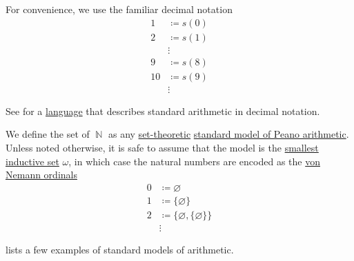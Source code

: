 \begin{definition}
  For convenience, we use the familiar decimal notation
  \begin{align*}
    1  &\coloneqq s(0) \\
    2  &\coloneqq s(1) \\
       &\vdots \\
    9  &\coloneqq s(8) \\
    10 &\coloneqq s(9) \\
       &\vdots
  \end{align*}

  See  for a \hyperref[def:language]{language} that describes standard arithmetic in decimal notation.
\end{definition}

\begin{definition}\label{def:set_of_natural_numbers}
  We define the set of  \( \BbbN \) as any \hyperref[sec:set_theory]{set-theoretic} \hyperref[def:peano_arithmetic]{standard model of Peano arithmetic}. Unless noted otherwise, it is safe to assume that the model is the \hyperref[def:smallest_inductive_set]{smallest inductive set} \( \omega \), in which case the natural numbers are encoded as the \hyperref[ex:natural_numbers_models/omega]{von Nemann ordinals}
  \begin{align*}
    0 &\coloneqq \varnothing \\
    1 &\coloneqq \{ \varnothing \} \\
    2 &\coloneqq \{ \varnothing, \{ \varnothing \} \} \\
      &\vdots
  \end{align*}

   lists a few examples of standard models of arithmetic.
\end{definition}

